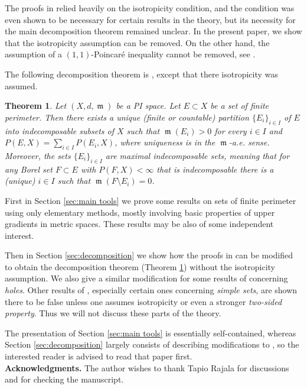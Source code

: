 \documentclass[11pt]{article}
\numberwithin{equation}{section}
\theoremstyle{plain}
\newtheorem{theorem}[equation]{Theorem}
\theoremstyle{definition}
\numberwithin{equation}{section}
\DeclareMathOperator{\frm}{\mathfrak{m}}
\begin{document}
The proofs in \cite{BPR} relied heavily on the isotropicity condition,
and the condition was even shown to be necessary for certain results in the theory,
but its necessity for the main decomposition theorem remained unclear.
In the present paper, we show that the
isotropicity assumption can be removed.
On the other hand, the assumption of a $(1,1)$-Poincar\'e inequality cannot be removed,
see \cite[Example 2.16]{BPR}.

The following decomposition theorem is \cite[Theorem 2.14]{BPR},
except that there isotropicity was assumed.

\begin{theorem}\label{thm:main decomposition}
	Let $(X,d,\frm)$ be a PI space. Let $E\subset X$ be a set of finite perimeter. Then there exists a unique
	(finite or countable) partition $\{E_i\}_{i\in I}$ of $E$ into indecomposable subsets of $X$
	such that $\frm(E_i)>0$ for every $i\in I$ and $P(E,X)=\sum_{i\in I}P(E_i,X)$, where
	uniqueness is in the $\frm$-a.e. sense. Moreover, the sets $\{E_i\}_{i\in I}$
	are maximal indecomposable sets, meaning that for any Borel set $F\subset E$ with
	$P(F,X)<\infty$ that is indecomposable there is a (unique) $i\in I$
	such that $\frm(F\setminus E_i)=0$.
\end{theorem}

First in Section \ref{sec:main tools} we prove some
results on sets of finite perimeter
using only elementary methods, mostly involving basic properties of upper gradients in metric 
spaces. 
These results may be also of some independent interest.

Then in Section \ref{sec:decomposition} we show how the proofs in \cite{BPR} can be modified
to obtain the decomposition theorem (Theorem \ref{thm:main decomposition}) without the isotropicity assumption.
We also give a similar modification for some results of \cite{BPR} concerning \emph{holes}.
Other results of \cite{BPR}, especially certain ones concerning \emph{simple sets},
are shown there to be false unless one assumes isotropicity or even a stronger
\emph{two-sided property}. Thus we will not discuss these parts of the theory.

The presentation of Section \ref{sec:main tools} is essentially self-contained, whereas
Section \ref{sec:decomposition} largely consists of describing modifications to \cite{BPR}, so the
interested reader is advised to read that paper first.\\

\textbf{Acknowledgments.}
The author wishes to thank Tapio Rajala for discussions and for checking the manuscript.
\end{document}
